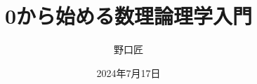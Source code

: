 \documentclass[10pt, a5j, ]{ltjsbook} %
\theoremstyle{definition}
\renewcommand{\presectionname}{\S}
\newcommand{\presubsectionname}{\S\S}
\begin{document}
\begin{titlepage}
	\title{0から始める数理論理学入門}
	\author{野口匠}
	\date{2024年7月17日}
	\maketitle
\end{titlepage}

\frontmatter



\tableofcontents

\mainmatter




%
%

\backmatter

\RenewDocumentCommand{\presectionname}{}{}
\RenewDocumentCommand{\presubsectionname}{}{}


\nocite{*}
\printbibliography[title=参考文献, heading=bibintoc]

\printindex[sidx]
\printindex[widx]

\newpage
\pagestyle{empty}
~
\newpage


\end{document}
